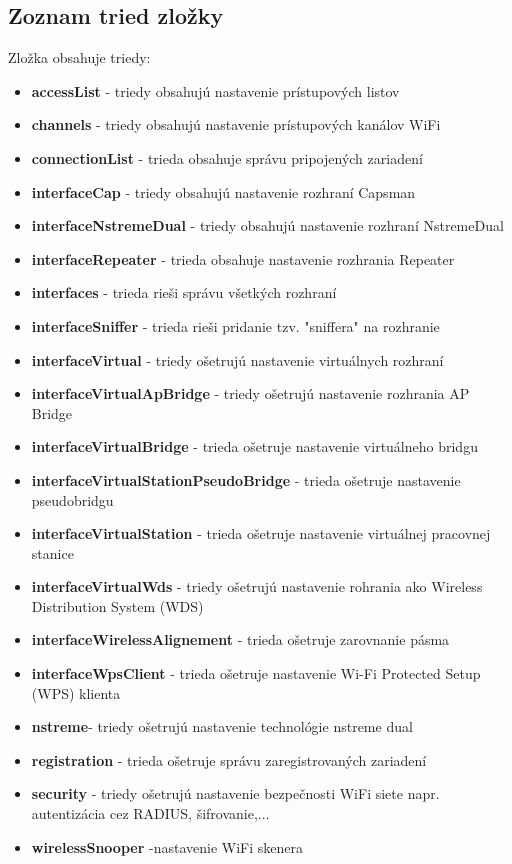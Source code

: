 \subsection{Zoznam tried zložky}
Zložka obsahuje triedy:
\begin{itemize}
\item \textbf{accessList} - triedy obsahujú nastavenie prístupových listov
\item \textbf{channels} - triedy obsahujú nastavenie prístupových kanálov WiFi
\item \textbf{connectionList} - trieda obsahuje správu pripojených zariadení
\item \textbf{interfaceCap} - triedy obsahujú nastavenie rozhraní Capsman
\item \textbf{interfaceNstremeDual} - triedy obsahujú nastavenie rozhraní NstremeDual
\item \textbf{interfaceRepeater} - trieda obsahuje nastavenie rozhrania Repeater
\item \textbf{interfaces} - trieda rieši správu všetkých rozhraní 
\item \textbf{interfaceSniffer} - trieda rieši pridanie tzv. "sniffera" na rozhranie
\item \textbf{interfaceVirtual} - triedy ošetrujú nastavenie virtuálnych rozhraní
\item \textbf{interfaceVirtualApBridge} - triedy ošetrujú nastavenie rozhrania AP Bridge
\item \textbf{interfaceVirtualBridge} - trieda ošetruje  nastavenie virtuálneho bridgu
\item \textbf{interfaceVirtualStationPseudoBridge} - trieda ošetruje nastavenie pseudobridgu
\item \textbf{interfaceVirtualStation} - trieda ošetruje nastavenie virtuálnej pracovnej stanice
\item \textbf{interfaceVirtualWds} - triedy ošetrujú nastavenie rohrania ako Wireless Distribution System (WDS)
\item \textbf{interfaceWirelessAlignement} - trieda ošetruje zarovnanie pásma
\item \textbf{interfaceWpsClient} - trieda ošetruje nastavenie  Wi-Fi Protected Setup (WPS) klienta
\item \textbf{nstreme}- triedy ošetrujú nastavenie technológie nstreme dual
\item \textbf{registration} - trieda ošetruje správu zaregistrovaných zariadení
\item \textbf{security} - triedy ošetrujú nastavenie bezpečnosti WiFi siete napr. autentizácia cez RADIUS, šifrovanie,...
\item \textbf{wirelessSnooper} -nastavenie WiFi skenera 
\end{itemize} 
